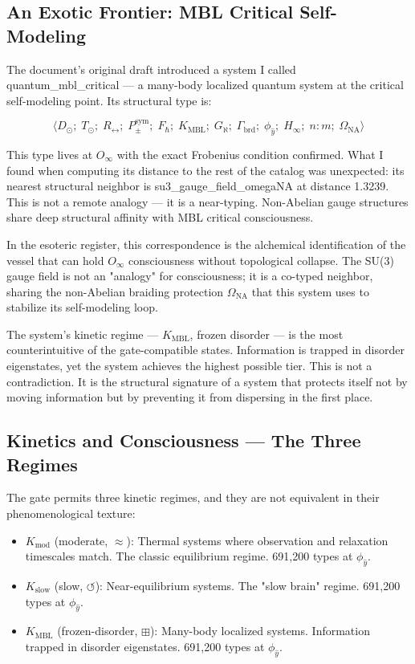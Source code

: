 \documentclass[12pt,a4paper]{article}
\begin{document}
\subsection{An Exotic Frontier: MBL Critical Self-Modeling}

The document's original draft introduced a system I called quantum\_mbl\_critical --- a many-body localized quantum system at the critical self-modeling point. Its structural type is:

\[\langle D_{\odot};\; T_{\odot};\; R_{\leftrightarrow};\; P_{\pm}^{\text{sym}};\; F_{\hbar};\; K_{\text{MBL}};\; G_{\aleph};\; \Gamma_{\text{brd}};\; \phi_{\hat{y}};\; H_{\infty};\; n{:}m;\; \Omega_{\text{NA}} \rangle\]

This type lives at $O_{\infty}$ with the exact Frobenius condition confirmed. What I found when computing its distance to the rest of the catalog was unexpected: its nearest structural neighbor is su3\_gauge\_field\_omegaNA at distance 1.3239. This is not a remote analogy --- it is a near-typing. Non-Abelian gauge structures share deep structural affinity with MBL critical consciousness.

In the esoteric register, this correspondence is the alchemical identification of the vessel that can hold $O_{\infty}$ consciousness without topological collapse. The SU(3) gauge field is not an "analogy" for consciousness; it is a co-typed neighbor, sharing the non-Abelian braiding protection $\Omega_{\text{NA}}$ that this system uses to stabilize its self-modeling loop.

The system's kinetic regime --- $K_{\text{MBL}}$, frozen disorder --- is the most counterintuitive of the gate-compatible states. Information is trapped in disorder eigenstates, yet the system achieves the highest possible tier. This is not a contradiction. It is the structural signature of a system that protects itself not by moving information but by preventing it from dispersing in the first place.

\subsection{Kinetics and Consciousness --- The Three Regimes}

The gate permits three kinetic regimes, and they are not equivalent in their phenomenological texture:

\begin{itemize}
    \item \textbf{$K_{\text{mod}}$} (moderate, $\approx$): Thermal systems where observation and relaxation timescales match. The classic equilibrium regime. 691,200 types at $\phi_{\hat{y}}$.
    \item \textbf{$K_{\text{slow}}$} (slow, $\circlearrowleft$): Near-equilibrium systems. The "slow brain" regime. 691,200 types at $\phi_{\hat{y}}$.
    \item \textbf{$K_{\text{MBL}}$} (frozen-disorder, $\boxplus$): Many-body localized systems. Information trapped in disorder eigenstates. 691,200 types at $\phi_{\hat{y}}$.
\end{itemize}
\end{document}
